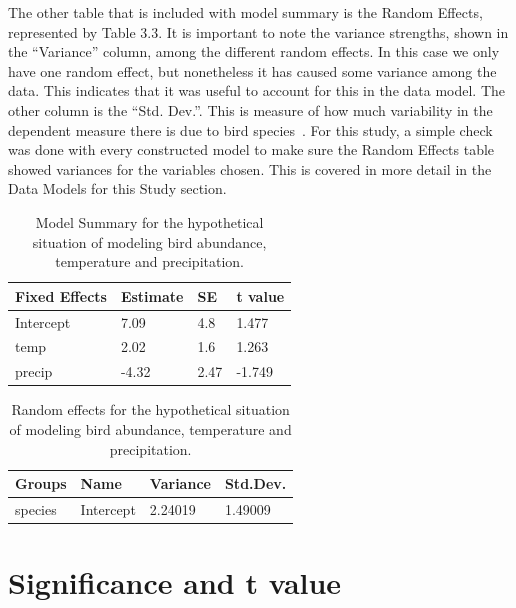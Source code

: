 The other table that is included with model summary is the Random Effects, represented by Table 3.3. It is important to note the variance strengths, shown in the ``Variance'' column, among the different random effects. In this case we only have one random effect, but nonetheless it has caused some variance among the data. This indicates that it was useful to account for this in the data model. The other column is the ``Std. Dev.''. This is measure of how much variability in the dependent measure there is due to bird species~\cite{RMixedEffect:online}. For this study, a simple check was done with every constructed model to make sure the Random Effects table showed variances for the variables chosen. This is covered in more detail in the Data Models for this Study section.   


\begin{longtable}[c]{|l|l|l|l|}
\caption{Model Summary for the hypothetical situation of modeling bird abundance, temperature and precipitation.}
\label{my-label}\\
\hline
Fixed Effects     & Estimate  & SE       & t value \\ \hline
\endhead
%
Intercept         & 7.09  & 4.8 & 1.477  \\ \hline
temp              & 2.02 & 1.6 & 1.263 \\ \hline
precip            & -4.32  & 2.47 & -1.749   \\ \hline
\end{longtable}

\begin{longtable}[c]{|l|l|l|l|}
\caption{Random effects for the hypothetical situation of modeling bird abundance, temperature and precipitation.}
\label{my-label}\\
\hline
Groups               & Name      & Variance & Std.Dev. \\ \hline
\endhead
%
species              & Intercept & 2.24019  & 1.49009  \\ \hline

\end{longtable}

\section{Significance and t value}

